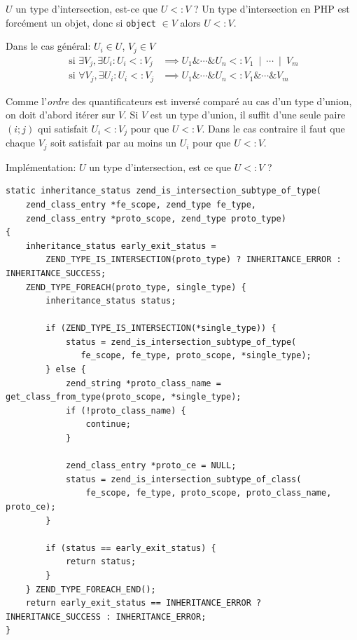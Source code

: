 \documentclass[10pt]{beamer}
\newcommand{\union}{\:\mathrel{|}\:}
\newcommand{\inter}{\mathrel{\&}}
\newcommand{\mif}{\text{ si }}
\newcommand{\subtype}{\mathrel{<:}}
\begin{document}
\begin{frame}{$U$ un type d'intersection, est-ce que $U \subtype V$ ?}
    Un type d'intersection en PHP est forcément un objet, donc si \texttt{object} $\in V$ alors $U \subtype V$.

    Dans le cas général:
    $U_i \in U$, $V_j \in V$
    \begin{align}
        \mif\exists V_j, \exists U_i : U_i \subtype V_j & \implies U_1\inter\cdots\inter U_n \subtype V_1\union\cdots\union V_m \\
        \mif\forall V_j, \exists U_i : U_i \subtype V_j & \implies U_1\inter\cdots\inter U_n \subtype V_1\inter\cdots\inter V_m
    \end{align}

    Comme l'\emph{ordre} des quantificateurs est inversé comparé au cas d'un type d'union, on doit d'abord itérer sur $V$.
    Si $V$ est un type d'union, il suffit d'une seule paire $(i;j)$ qui satisfait  $U_i \subtype V_j$ pour que $U \subtype V$.
    Dans le cas contraire il faut que chaque $V_j$ soit satisfait par au moins un $U_i$ pour que $U \subtype V$.
\end{frame}
\begin{frame}[fragile]{Implémentation: $U$ un type d'intersection, est ce que $U \subtype V$ ?}
    \begin{verbatim}
static inheritance_status zend_is_intersection_subtype_of_type(
    zend_class_entry *fe_scope, zend_type fe_type,
    zend_class_entry *proto_scope, zend_type proto_type)
{
    inheritance_status early_exit_status =
        ZEND_TYPE_IS_INTERSECTION(proto_type) ? INHERITANCE_ERROR : INHERITANCE_SUCCESS;
    ZEND_TYPE_FOREACH(proto_type, single_type) {
        inheritance_status status;

        if (ZEND_TYPE_IS_INTERSECTION(*single_type)) {
            status = zend_is_intersection_subtype_of_type(
               fe_scope, fe_type, proto_scope, *single_type);
        } else {
            zend_string *proto_class_name = get_class_from_type(proto_scope, *single_type);
            if (!proto_class_name) {
                continue;
            }

            zend_class_entry *proto_ce = NULL;
            status = zend_is_intersection_subtype_of_class(
                fe_scope, fe_type, proto_scope, proto_class_name, proto_ce);
        }

        if (status == early_exit_status) {
            return status;
        }
    } ZEND_TYPE_FOREACH_END();
    return early_exit_status == INHERITANCE_ERROR ? INHERITANCE_SUCCESS : INHERITANCE_ERROR;
}
    \end{verbatim}
\end{frame}
\end{document}
